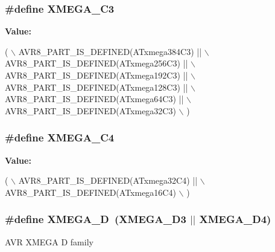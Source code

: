 \subsubsection[{X\+M\+E\+G\+A\+\_\+\+C3}]{\setlength{\rightskip}{0pt plus 5cm}\#define X\+M\+E\+G\+A\+\_\+\+C3}\label{group__xmega__part__macros__group_ga10c26d10c3df7d9874e4527d1327c60b}
{\bfseries Value\+:}
\begin{DoxyCode}
( \(\backslash\)
        AVR8\_PART\_IS\_DEFINED(ATxmega384C3)  || \(\backslash\)
        AVR8\_PART\_IS\_DEFINED(ATxmega256C3)  || \(\backslash\)
        AVR8\_PART\_IS\_DEFINED(ATxmega192C3)  || \(\backslash\)
        AVR8\_PART\_IS\_DEFINED(ATxmega128C3)  || \(\backslash\)
        AVR8\_PART\_IS\_DEFINED(ATxmega64C3)   || \(\backslash\)
        AVR8\_PART\_IS\_DEFINED(ATxmega32C3) \(\backslash\)
        )
\end{DoxyCode}
\hypertarget{group__xmega__part__macros__group_ga8add217f9d3d28fda40ec91e65a5d970}{}
\subsubsection[{X\+M\+E\+G\+A\+\_\+\+C4}]{\setlength{\rightskip}{0pt plus 5cm}\#define X\+M\+E\+G\+A\+\_\+\+C4}\label{group__xmega__part__macros__group_ga8add217f9d3d28fda40ec91e65a5d970}
{\bfseries Value\+:}
\begin{DoxyCode}
( \(\backslash\)
        AVR8\_PART\_IS\_DEFINED(ATxmega32C4)  || \(\backslash\)
        AVR8\_PART\_IS\_DEFINED(ATxmega16C4) \(\backslash\)
        )
\end{DoxyCode}
\hypertarget{group__xmega__part__macros__group_gacc9e4b074c3f87ce7b461483b0beb15c}{}
\subsubsection[{X\+M\+E\+G\+A\+\_\+\+D}]{\setlength{\rightskip}{0pt plus 5cm}\#define X\+M\+E\+G\+A\+\_\+\+D~(X\+M\+E\+G\+A\+\_\+\+D3 $\vert$$\vert$ X\+M\+E\+G\+A\+\_\+\+D4)}\label{group__xmega__part__macros__group_gacc9e4b074c3f87ce7b461483b0beb15c}
A\+V\+R X\+M\+E\+G\+A D family \hypertarget{group__xmega__part__macros__group_gad634208a506f79622c67be500014feb3}{}
